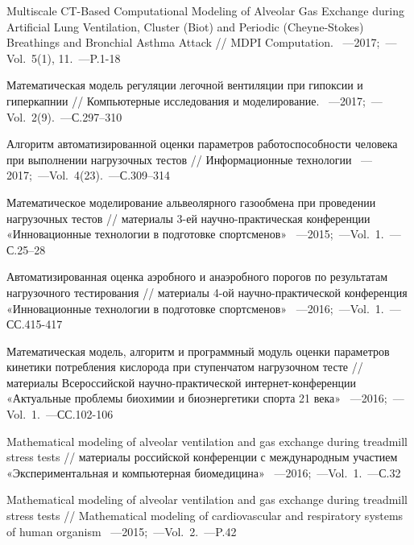 \renewcommand{\refname}{\Large Публикации автора по теме диссертации}
\nocite{*}
{\bibname}	%

\begin{thebibliography}{}
    
     Multiscale CT-Based Computational Modeling of Alveolar Gas Exchange during Artificial Lung Ventilation, Cluster (Biot) and Periodic (Cheyne-Stokes) Breathings and Bronchial Asthma Attack // MDPI Computation. ~---2017;~---Vol.~5(1), 11.~---P.1-18
    
     Математическая модель регуляции легочной вентиляции при гипоксии и гиперкапнии // Компьютерные исследования и моделирование. ~---2017;~---Vol.~2(9).~---С.297–310
    
     Алгоритм автоматизированной оценки параметров работоспособности человека при выполнении нагрузочных тестов // Информационные технологии ~---2017;~---Vol.~4(23).~---С.309–314

     Математическое моделирование альвеолярного газообмена при проведении нагрузочных тестов // материалы 3-ей научно-практическая конференции «Инновационные технологии в подготовке спортсменов» ~---2015;~---Vol.~1.~---С.25–28
    
     Автоматизированная оценка аэробного и анаэробного порогов по результатам нагрузочного тестирования // материалы 4-ой научно-практической конференция «Инновационные технологии в подготовке спортсменов» ~---2016;~---Vol.~1.~---СС.415-417
    
     Математическая модель, алгоритм и программный модуль оценки параметров кинетики потребления кислорода при ступенчатом нагрузочном тесте // материалы Всероссийской научно-практической интернет-конференции «Актуальные проблемы биохимии и биоэнергетики спорта 21 века» ~---2016;~---Vol.~1.~---СС.102-106

     Mathematical modeling of alveolar ventilation and gas exchange during treadmill stress tests // материалы российской конференции с международным участием «Экспериментальная и компьютерная биомедицина» ~---2016;~---Vol.~1.~---С.32
    
     Mathematical modeling of alveolar ventilation and gas exchange during treadmill stress tests // Mathematical modeling of cardiovascular and  respiratory systems of human organism ~---2015;~---Vol.~2.~---P.42
\end{thebibliography}

